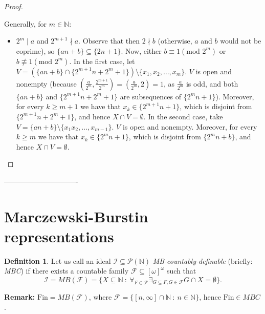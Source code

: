 \documentclass{amsart}
\theoremstyle{definition}
\newtheorem{df}{Definition}
\theoremstyle{definition}
\newcommand{\N}{{\mathbb N}}
\newcommand{\Fin}{\textrm{Fin}}
\newcommand{\I}{\mathcal I}
\newcommand{\J}{\mathcal J}
\begin{document}
\begin{proof}
\begin{itemize}
\end{itemize}
Generally, for $m\in\N$:
\begin{itemize}
 \item $2^m\mid a$ and $2^{m+1}\nmid a$. Observe that then $2 \nmid b$ (otherwise, $a$ and $b$ would not be coprime), so $\{an+b\}\subseteq \{2n+1\}$. Now, either $b\equiv 1 (\textrm{mod } 2^m)$ or $b \not\equiv 1 (\textrm{mod } 2^m)$. In the first case, let $V = (\{an+b\} \cap \{2^{m+1}n+2^m+1\})\setminus\{x_1, x_2,\ldots, x_m\}$. $V$ is open and nonempty (because $(\frac{a}{2^m},\frac{2^{m+1}}{2^m})=(\frac{a}{2^m},2)=1$, as $\frac{a}{2^m}$ is odd, and both $\{an+b\}$ and $\{2^{m+1}n+2^m+1\}$ are subsequences of $\{2^m n+1\}$). Moreover, for every $k\geq m+1$ we have that $x_k\in \{2^{m+1}n+1\}$, which is disjoint from $\{2^{m+1}n+2^m+1\}$, and hence $X\cap V = \emptyset$. In the second case, take $V = \{an+b\} \setminus\{x_1x_2,\ldots, x_{m-1}\}$. $V$ is open and nonempty. Moreover, for every $k\geq m$ we have that $x_k\in \{2^m n+1\}$, which is disjoint from $\{2^m n+b\}$, and hence $X\cap V = \emptyset$.
\end{itemize}
\end{proof}

-------------------------------




\color{black}
\section{Marczewski-Burstin representations}

\begin{df}
Let us call an ideal $\I\subseteq \mathcal{P}(\N)$ 
\emph{MB-countably-definable}
(briefly: \emph{MBC}) if there exists 
a countable family $\mathcal{F}\subseteq [\omega]^\omega$
such that
$$\I = MB(\mathcal{F}) = \{X\subseteq\N\ :\ \forall_{F\in\mathcal{F}} \exists_{G\subseteq F, G\in\mathcal{F}} G\cap X=\emptyset\}.$$
\end{df}
\textbf{Remark:} $\Fin = MB(\mathcal{F})$, where $\mathcal{F}= \{[n, \infty]\cap\N\ :\ n\in\N\}$, 
hence $\Fin\in MBC$.\\
		
\end{document}
